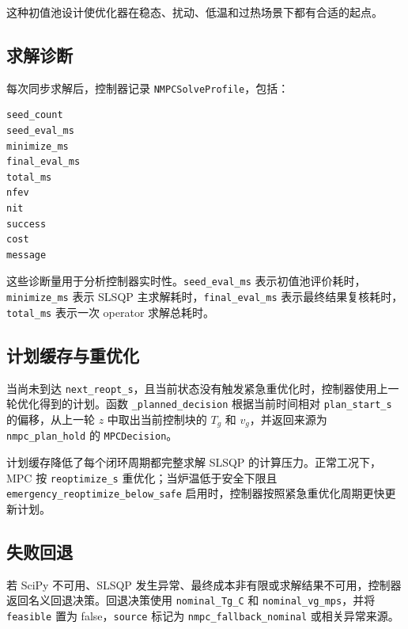 \documentclass[UTF8,openany,zihao=-4,oneside]{ctexbook}
\providecommand{\passthrough}[1]{#1}
\begin{document}
这种初值池设计使优化器在稳态、扰动、低温和过热场景下都有合适的起点。

\subsection{求解诊断}\label{subsec:nmpc-solve-profile}

每次同步求解后，控制器记录 \passthrough{\lstinline!NMPCSolveProfile!}，包括：

\begin{lstlisting}
seed_count
seed_eval_ms
minimize_ms
final_eval_ms
total_ms
nfev
nit
success
cost
message
\end{lstlisting}

这些诊断量用于分析控制器实时性。\passthrough{\lstinline!seed_eval_ms!} 表示初值池评价耗时，\passthrough{\lstinline!minimize_ms!} 表示 SLSQP 主求解耗时，\passthrough{\lstinline!final_eval_ms!} 表示最终结果复核耗时，\passthrough{\lstinline!total_ms!} 表示一次 operator 求解总耗时。

\subsection{计划缓存与重优化}\label{subsec:nmpc-plan-cache}

当尚未到达 \passthrough{\lstinline!next_reopt_s!}，且当前状态没有触发紧急重优化时，控制器使用上一轮优化得到的计划。函数 \passthrough{\lstinline!_planned_decision!} 根据当前时间相对 \passthrough{\lstinline!plan_start_s!} 的偏移，从上一轮 \(z\) 中取出当前控制块的 \(T_g\) 和 \(v_g\)，并返回来源为 \passthrough{\lstinline!nmpc_plan_hold!} 的 \passthrough{\lstinline!MPCDecision!}。

计划缓存降低了每个闭环周期都完整求解 SLSQP 的计算压力。正常工况下，MPC 按 \passthrough{\lstinline!reoptimize_s!} 重优化；当炉温低于安全下限且 \passthrough{\lstinline!emergency_reoptimize_below_safe!} 启用时，控制器按照紧急重优化周期更快更新计划。

\subsection{失败回退}\label{subsec:nmpc-fallback}

若 SciPy 不可用、SLSQP 发生异常、最终成本非有限或求解结果不可用，控制器返回名义回退决策。回退决策使用 \passthrough{\lstinline!nominal_Tg_C!} 和 \passthrough{\lstinline!nominal_vg_mps!}，并将 \passthrough{\lstinline!feasible!} 置为 false，\passthrough{\lstinline!source!} 标记为 \passthrough{\lstinline!nmpc_fallback_nominal!} 或相关异常来源。
\end{document}
